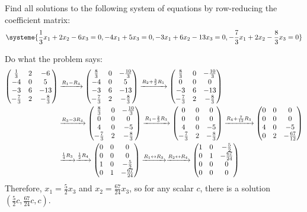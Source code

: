 \begin{xca}
  Find all solutions to the following system of equations by row-reducing the coefficient matrix:
  \[ \systeme{\frac13x_1 + 2x_2 - 6x_3 = 0, -4x_1 + 5x_3 = 0, -3x_1 + 6x_2 - 13x_3 = 0, -\frac73x_1 + 2x_2 - \frac83x_3 = 0} \]
\end{xca}
\begin{sol}
  Do what the problem says:
  \begin{equation*}
    \begin{split}
      \mqty(\frac13&2&-6 \\ -4&0&5 \\ -3&6&-13 \\ -\frac73&2&-\frac83)
      & \xto{R_1 - R_4} \mqty(\frac83&0&-\frac{10}3 \\ -4&0&5 \\ -3&6&-13 \\ -\frac73&2&-\frac83)
      \xto{R_2 + \frac32 R_1} \mqty(\frac83&0&-\frac{10}3 \\ 0&0&0 \\ -3&6&-13 \\ -\frac73&2&-\frac83) \\
      & \xto{R_3 - 3R_4} \mqty(\frac83&0&-\frac{10}3 \\ 0&0&0 \\ 4&0&-5 \\ -\frac73&2&-\frac83)
      \xto{R_1 - \frac23 R_3} \mqty(0&0&0 \\ 0&0&0 \\ 4&0&-5 \\ -\frac73&2&-\frac83)
      \xto{R_4 + \frac7{12} R_3} \mqty(0&0&0 \\ 0&0&0 \\ 4&0&-5 \\ 0&2&-\frac{67}{12}) \\
      & \xto{\frac14 R_3}
      \xto{\frac12 R_4} \mqty(0&0&0 \\ 0&0&0 \\ 1&0&-\frac52 \\ 0&1&-\frac{67}{24})
      \xto{R_1 \harr R_3}
      \xto{R_2 \harr R_4} \mqty(1&0&-\frac52 \\ 0&1&-\frac{67}{24} \\ 0&0&0 \\ 0&0&0)
    \end{split}
  \end{equation*}
  Therefore, $x_1 = \frac52 x_3$ and $x_2 = \frac{67}{24} x_3$,
  so for any scalar $c$, there is a solution $(\frac52c, \frac{67}{24}c, c)$.
\end{sol}


